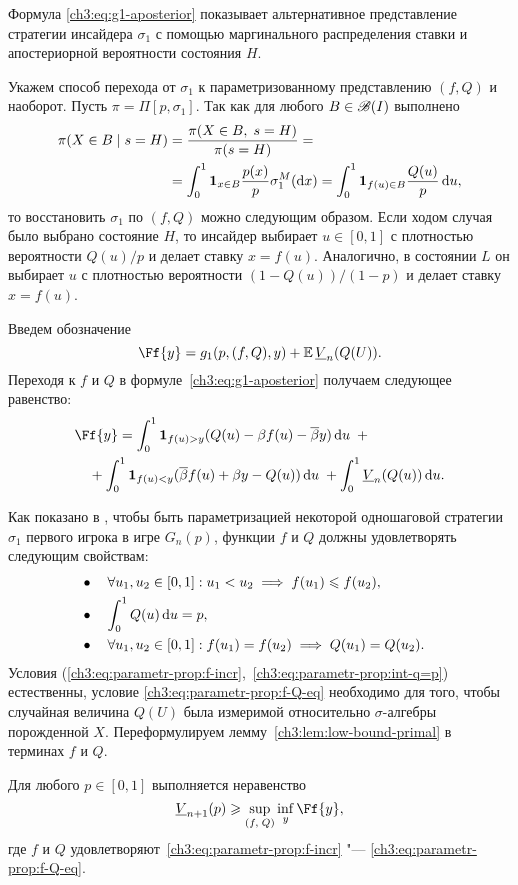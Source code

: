 {Формула \eqref{ch3:eq:g1-aposterior} показывает альтернативное представление стратегии инсайдера $\sigma_1$ с помощью маргинального распределения ставки и апостериорной вероятности состояния $H$.

Укажем способ перехода от $\sigma_1$ к параметризованному представлению $(f, Q)$ и наоборот.
Пусть $\pi = \Pi[p, \sigma_1]$.
Так как для любого $B \in \mathscr{B}(I)$ выполнено
\begin{align*}
  \pi(X \in B \; | \; s = H) 
  &= \frac{\pi(X \in B, \; s = H)}{\pi(s = H)} = \\
  &= \int_0^1 \mathbf{1}_{x \in B} \frac{p(x)}{p} \sigma^M_1(\mathop{}\!\mathrm{d} x) =
  \int_0^1 \mathbf{1}_{f(u) \in B} \frac{Q(u)}{p} \mathop{}\!\mathrm{d} u,
\end{align*}
то восстановить $\sigma_1$ по $(f, Q)$ можно следующим образом.
Если ходом случая было выбрано состояние $H$, то инсайдер выбирает $u \in [0, 1]$ с плотностью вероятности $Q(u)/p$ и делает ставку $x = f(u)$.
Аналогично, в состоянии $L$ он выбирает $u$ с плотностью вероятности $(1 - Q(u))/(1 - p)$ и делает ставку $x = f(u)$.

Введем обозначение
\[
  \Ff{y} = g_1(p, (f, Q), y) + \E \LV{n}(Q(U)).
\]
Переходя к $f$ и $Q$ в формуле~\eqref{ch3:eq:g1-aposterior} получаем следующее равенство:
\begin{equation}\label{ch3:eq:F(f,Q,p)}
\begin{multlined}
  \Ff{y} =
  \int_0^1 \Ind{f(u) > y} (Q(u) - \Co f(u) - \DCo y) \di u \enskip + \\
  + \int_0^1 \Ind{f(u) < y} (\DCo f(u) + \Co y - Q(u)) \di u \; + \int_0^1
  \LV{n}(Q(u)) \di u.
\end{multlined}
\end{equation}

Как показано в \cite{demeyer02}, чтобы быть параметризацией некоторой одношаговой стратегии $\sigma_1$ первого игрока в игре $G_n(p)$, функции $f$ и $Q$ должны удовлетворять следующим свойствам:
\begin{subequations}
  \begin{flalign}
    \label{ch3:eq:parametr-prop:f-incr}
    &\bullet\quad \forall u_1, u_2 \in [0, 1]: u_1 < u_2 \implies f(u_1) \leqslant f(u_2),&\\
    \label{ch3:eq:parametr-prop:int-q=p}
    &\bullet\quad \int_0^1 Q(u) \mathop{}\!\mathrm{d} u = p,&\\
    \label{ch3:eq:parametr-prop:f-Q-eq}
    &\bullet\quad \forall u_1, u_2 \in [0, 1]: f(u_1) = f(u_2) \implies Q(u_1) = Q(u_2).&
  \end{flalign}
\end{subequations}
Условия (\ref{ch3:eq:parametr-prop:f-incr},~\ref{ch3:eq:parametr-prop:int-q=p}) естественны, условие \eqref{ch3:eq:parametr-prop:f-Q-eq} необходимо для того, чтобы случайная величина $Q(U)$ была измеримой относительно $\sigma$-алгебры порожденной $X$.
Переформулируем лемму~\ref{ch3:lem:low-bound-primal} в терминах $f$ и $Q$.
\begin{lemma}
  Для любого $p \in [0, 1]$ выполняется неравенство
  \[
    \LV{n+1}(p) \geqslant \sup_{(f, \; Q)} \inf_{y} \Ff{y},
  \]
  где $f$ и $Q$ удовлетворяют~\eqref{ch3:eq:parametr-prop:f-incr} "--- \eqref{ch3:eq:parametr-prop:f-Q-eq}.
\end{lemma}

}
